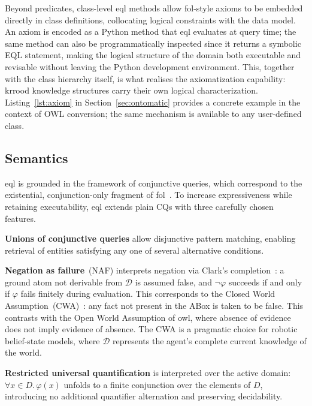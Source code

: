 \documentclass{article}
\begin{document}
Beyond predicates, class-level \ac{eql} methods allow \ac{fol}-style axioms
to be embedded directly in class definitions, collocating logical constraints
with the data model. An axiom is encoded as a Python method that \ac{eql} evaluates at query
time; the same method can also be programmatically inspected since it returns a symbolic EQL statement, making the logical structure of
the domain both executable and revisable without leaving the Python
development environment. This, together with the class hierarchy itself, is what realises the
axiomatization capability: \ac{krrood} knowledge structures carry their own logical characterization. Listing~\ref{lst:axiom} in Section~\ref{sec:ontomatic}
provides a concrete example in the context of OWL conversion; the same
mechanism is available to any user-defined class.


\subsection{Semantics}
\label{ssec:eql_semantics}

\ac{eql} is grounded in the framework of conjunctive queries, which
correspond to the existential, conjunction-only fragment of
\ac{fol}~\cite{ChandraMerlin1977,AbiteboulHullVianu1995}. To increase
expressiveness while retaining executability, \ac{eql} extends plain CQs
with three carefully chosen features.

\textbf{Unions of conjunctive queries} allow disjunctive pattern matching,
enabling retrieval of entities satisfying any one of several alternative
conditions.

\textbf{Negation as failure}~(NAF) interprets negation via Clark's
completion~\cite{ClarkCompletion1978}: a ground atom not derivable from
$\mathcal{D}$ is assumed false, and $\neg\varphi$ succeeds if and only if
$\varphi$ fails finitely during evaluation. This corresponds to the Closed
World Assumption~(CWA)~\cite{Reiter1978}: any fact not present in the ABox is
taken to be false. This contrasts with the Open World Assumption of \ac{owl},
where absence of evidence does not imply evidence of absence. The CWA is a pragmatic choice for robotic belief-state models, where $\mathcal{D}$
represents the agent's complete current knowledge of the world.

\textbf{Restricted universal quantification} is interpreted over the active
domain: $\forall x \in D.\,\varphi(x)$ unfolds to a finite conjunction over
the elements of $D$, introducing no additional quantifier alternation and
preserving decidability.
\end{document}
